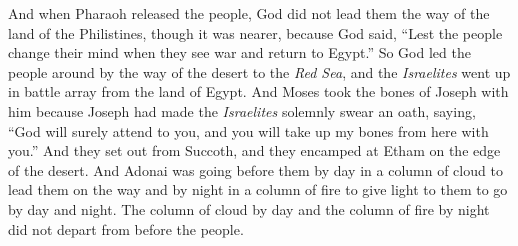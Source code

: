 \begin{biblechapter}
 And when Pharaoh released the people, God did not lead them the way of the land of the Philistines, though it was nearer, because God said, “Lest the people change their mind when they see war and return to Egypt.”
\verse So God led the people around by the way of the desert to the \textit{Red Sea}, and the \textit{Israelites} went up in battle array from the land of Egypt.
\verse And Moses took the bones of Joseph with him because Joseph had made the \textit{Israelites} solemnly swear an oath, saying, “God will surely attend to you, and you will take up my bones from here with you.”
\verse And they set out from Succoth, and they encamped at Etham on the edge of the desert.
\verse And Adonai was going before them by day in a column of cloud to lead them on the way and by night in a column of fire to give light to them to go by day and night.
\verse The column of cloud by day and the column of fire by night did not depart from before the people.
\end{biblechapter}

